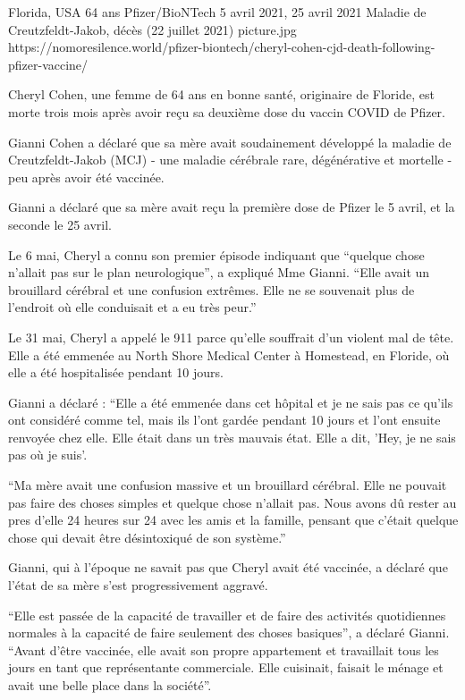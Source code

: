 {Florida, USA}
{64 ans}
{Pfizer/BioNTech}
{5 avril 2021, 25 avril 2021}
{Maladie de Creutzfeldt-Jakob, décès (22 juillet 2021)}
{picture.jpg}
{https://nomoresilence.world/pfizer-biontech/cheryl-cohen-cjd-death-following-pfizer-vaccine/}
{

Cheryl Cohen, une femme de 64 ans en bonne santé, originaire de Floride, est
morte trois mois après avoir reçu sa deuxième dose du vaccin COVID de Pfizer.

Gianni Cohen a déclaré que sa mère avait soudainement développé la maladie de
Creutzfeldt-Jakob (MCJ) - une maladie cérébrale rare, dégénérative et mortelle -
peu après avoir été vaccinée.

Gianni a déclaré que sa mère avait reçu la première dose de Pfizer le 5 avril,
et la seconde le 25 avril.

Le 6 mai, Cheryl a connu son premier épisode indiquant que “quelque chose
n'allait pas sur le plan neurologique”, a expliqué Mme Gianni. “Elle avait un
brouillard cérébral et une confusion extrêmes. Elle ne se souvenait plus de
l'endroit où elle conduisait et a eu très peur.”

Le 31 mai, Cheryl a appelé le 911 parce qu'elle souffrait d'un violent mal de
tête. Elle a été emmenée au North Shore Medical Center à Homestead, en Floride,
où elle a été hospitalisée pendant 10 jours.

Gianni a déclaré : “Elle a été emmenée dans cet hôpital et je ne sais pas ce
qu'ils ont considéré comme tel, mais ils l'ont gardée pendant 10 jours et l'ont
ensuite renvoyée chez elle. Elle était dans un très mauvais état. Elle a dit,
'Hey, je ne sais pas où je suis'.

“Ma mère avait une confusion massive et un brouillard cérébral. Elle ne pouvait
pas faire des choses simples et quelque chose n'allait pas. Nous avons dû rester
au pres d'elle 24 heures sur 24 avec les amis et la famille, pensant que c'était
quelque chose qui devait être désintoxiqué de son système.”

Gianni, qui à l'époque ne savait pas que Cheryl avait été vaccinée, a déclaré
que l'état de sa mère s'est progressivement aggravé.

“Elle est passée de la capacité de travailler et de faire des activités
quotidiennes normales à la capacité de faire seulement des choses basiques”, a
déclaré Gianni. “Avant d'être vaccinée, elle avait son propre appartement et
travaillait tous les jours en tant que représentante commerciale. Elle
cuisinait, faisait le ménage et avait une belle place dans la société”.

}

